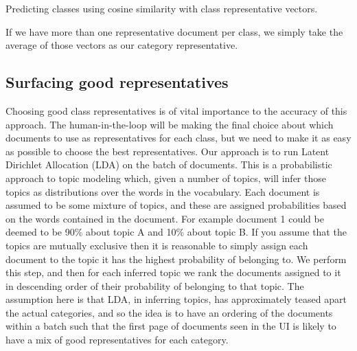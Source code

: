 \begin{algorithm}[!h]
\caption{Predicting classes using cosine similarity with class representative vectors.}
\label{algo:classification}
\end{algorithm}

If we have more than one representative document per class, we simply take the average of those vectors as our category representative.

\subsection{Surfacing good representatives}
Choosing good class representatives is of vital importance to the accuracy of this approach. The human-in-the-loop will be making the final choice about which documents to use as representatives for each class, but we need to make it as easy as possible to choose the best representatives. Our approach is to run Latent Dirichlet Allocation (LDA) on the batch of documents. This is a probabilistic approach to topic modeling which, given a number of topics, will infer those topics as distributions over the words in the vocabulary. Each document is assumed to be some mixture of topics, and these are assigned probabilities based on the words contained in the document. For example document 1 could be deemed to be 90\% about topic A and 10\% about topic B. If you assume that the topics are mutually exclusive then it is reasonable to simply assign each document to the topic it has the highest probability of belonging to. We perform this step, and then for each inferred topic we rank the documents assigned to it in descending order of their probability of belonging to that topic. The assumption here is that LDA, in inferring topics, has approximately teased apart the actual categories, and so the idea is to have an ordering of the documents within a batch such that the first page of documents seen in the UI is likely to have a mix of good representatives for each category.
